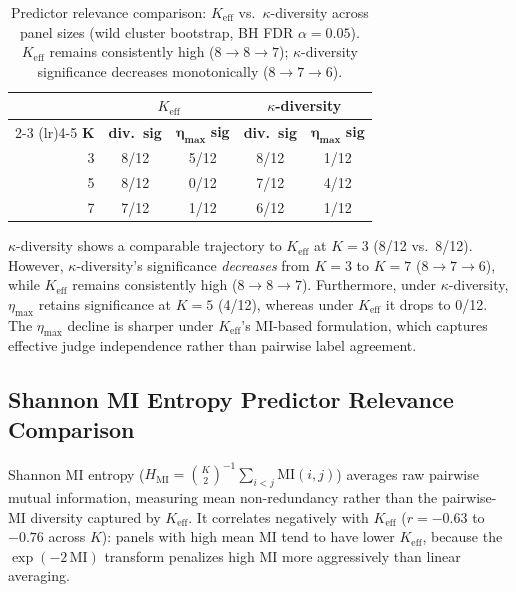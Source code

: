 \begin{table}[h]
\centering
\small
\caption{Predictor relevance comparison: $K_{\mathrm{eff}}$ vs.\ $\kappa$-diversity across panel sizes (wild cluster bootstrap, BH FDR $\alpha{=}0.05$). $K_{\mathrm{eff}}$ remains consistently high ($8 \to 8 \to 7$); $\kappa$-diversity significance decreases monotonically ($8 \to 7 \to 6$).}
\label{tab:kappa_regime}
\begin{tabular}{rcccc}
\toprule
& \multicolumn{2}{c}{\textbf{$K_{\mathrm{eff}}$}} & \multicolumn{2}{c}{\textbf{$\kappa$-diversity}} \\
\cmidrule(lr){2-3} \cmidrule(lr){4-5}
$\boldsymbol{K}$ & \textbf{div.\ sig} & $\boldsymbol{\eta_{\max}}$ \textbf{sig} & \textbf{div.\ sig} & $\boldsymbol{\eta_{\max}}$ \textbf{sig} \\
\midrule
3 & 8/12  & 5/12 & 8/12 & 1/12 \\
5 & 8/12 & 0/12 & 7/12 & 4/12 \\
7 & 7/12  & 1/12 & 6/12 & 1/12 \\
\bottomrule
\end{tabular}
\end{table}

$\kappa$-diversity shows a comparable trajectory to $K_{\mathrm{eff}}$ at $K{=}3$ (8/12 vs.\ 8/12). However, $\kappa$-diversity's significance \emph{decreases} from $K{=}3$ to $K{=}7$ ($8 \to 7 \to 6$), while $K_{\mathrm{eff}}$ remains consistently high ($8 \to 8 \to 7$). Furthermore, under $\kappa$-diversity, $\eta_{\max}$ retains significance at $K{=}5$ (4/12), whereas under $K_{\mathrm{eff}}$ it drops to 0/12. The $\eta_{\max}$ decline is sharper under $K_{\mathrm{eff}}$'s MI-based formulation, which captures effective judge independence rather than pairwise label agreement.

\subsection{Shannon MI Entropy Predictor Relevance Comparison}
\label{app:shannon_entropy}

Shannon MI entropy ($H_{\mathrm{MI}} = \binom{K}{2}^{-1} \sum_{i<j} \mathrm{MI}(i,j)$) averages raw pairwise mutual information, measuring mean non-redundancy rather than the pairwise-MI diversity captured by $K_{\mathrm{eff}}$. It correlates negatively with $K_{\mathrm{eff}}$ ($r = -0.63$ to $-0.76$ across $K$): panels with high mean MI tend to have lower $K_{\mathrm{eff}}$, because the $\exp(-2\,\mathrm{MI})$ transform penalizes high MI more aggressively than linear averaging.

